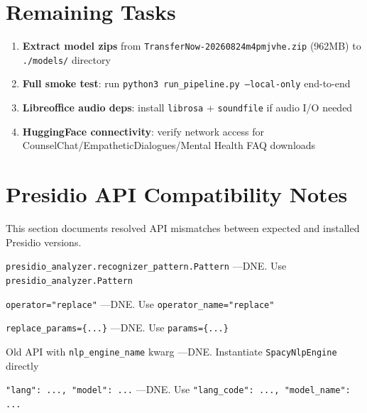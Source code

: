 \documentclass[11pt,a4paper]{article}
\begin{document}
\section{Remaining Tasks}

\begin{tcolorbox}[warnBox={To Do}]
\begin{enumerate}[label=\textcolor{orange}{\textsf{o}}\ \arabic*., leftmargin=*]
\item \textbf{Extract model zips} from \texttt{TransferNow-20260824m4pmjvhe.zip} (962MB) to \texttt{./models/} directory
\item \textbf{Full smoke test}: run \texttt{python3 run\_pipeline.py --local-only} end-to-end
\item \textbf{Libreoffice audio deps}: install \texttt{librosa} + \texttt{soundfile} if audio I/O needed
\item \textbf{HuggingFace connectivity}: verify network access for CounselChat/EmpatheticDialogues/Mental Health FAQ downloads
\end{enumerate}
\end{tcolorbox}

\clearpage
\appendix
\section{Presidio API Compatibility Notes}

This section documents resolved API mismatches between expected and installed Presidio versions.

\begin{tcolorbox}[colback=lightgray!30, colframe=indigodark, title=API Migration Notes, fonttitle=\sffamily\bfseries]
\begin{description}[leftmargin=2.5cm, labelwidth=2cm]
\item[Pattern import] \texttt{presidio\_analyzer.recognizer\_pattern.Pattern} ---DNE. Use \texttt{presidio\_analyzer.Pattern}
\item[OperatorConfig] \texttt{operator="replace"} ---DNE. Use \texttt{operator\_name="replace"}
\item[OperatorConfig params] \texttt{replace\_params=\{...\}} ---DNE. Use \texttt{params=\{...\}}
\item[NlpEngineProvider] Old API with \texttt{nlp\_engine\_name} kwarg ---DNE. Instantiate \texttt{SpacyNlpEngine} directly
\item[SpacyNlpEngine models] \texttt{"lang": ..., "model": ...} ---DNE. Use \texttt{"lang\_code": ..., "model\_name": ...}
\end{description}
\end{tcolorbox}
\end{document}

